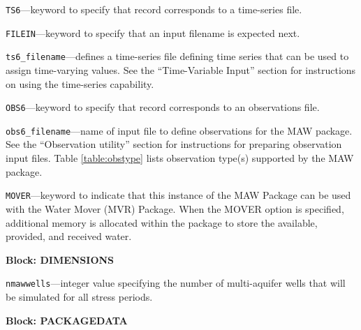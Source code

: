 \begin{description}
\item \texttt{TS6}---keyword to specify that record corresponds to a time-series file.

\item \texttt{FILEIN}---keyword to specify that an input filename is expected next.

\item \texttt{ts6\_filename}---defines a time-series file defining time series that can be used to assign time-varying values. See the ``Time-Variable Input'' section for instructions on using the time-series capability.

\item \texttt{OBS6}---keyword to specify that record corresponds to an observations file.

\item \texttt{obs6\_filename}---name of input file to define observations for the MAW package. See the ``Observation utility'' section for instructions for preparing observation input files. Table \ref{table:obstype} lists observation type(s) supported by the MAW package.

\item \texttt{MOVER}---keyword to indicate that this instance of the MAW Package can be used with the Water Mover (MVR) Package.  When the MOVER option is specified, additional memory is allocated within the package to store the available, provided, and received water.

\end{description}
\item \textbf{Block: DIMENSIONS}

\begin{description}
\item \texttt{nmawwells}---integer value specifying the number of multi-aquifer wells that will be simulated for all stress periods.

\end{description}
\item \textbf{Block: PACKAGEDATA}

